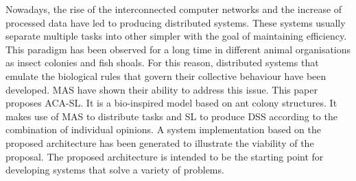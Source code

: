 
Nowadays, the rise of the interconnected computer networks and the increase of processed data have led to producing distributed systems. These systems usually separate multiple tasks into other simpler with the goal of maintaining efficiency. This paradigm has been observed for a long time in different animal organisations as insect colonies and fish shoals. For this reason, distributed systems that emulate the biological rules that govern their collective behaviour have been developed. \gls{MAS} have shown their ability to address this issue. This paper proposes \gls{ACA-SL}. It is a bio-inspired model based on ant colony structures. It makes use of \gls{MAS} to distribute tasks and \gls{SL} to produce \gls{DSS} according to the combination of individual opinions. A system implementation based on the proposed architecture has been generated to illustrate the viability of the proposal. The proposed architecture is intended to be the starting point for developing systems that solve a variety of problems.


